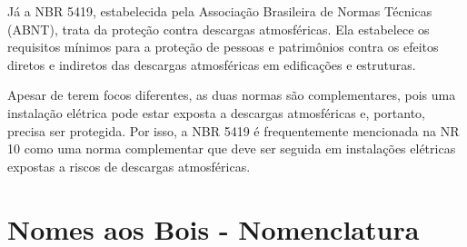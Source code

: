 \documentclass[a4paper, 12pt, onecolumn,singlespacing]{article}
\begin{document}
		Já a NBR 5419, estabelecida pela Associação Brasileira de Normas Técnicas (ABNT), trata da proteção contra descargas atmosféricas. Ela estabelece os requisitos mínimos para a proteção de pessoas e patrimônios contra os efeitos diretos e indiretos das descargas atmosféricas em edificações e estruturas.
		
		Apesar de terem focos diferentes, as duas normas são complementares, pois uma instalação elétrica pode estar exposta a descargas atmosféricas e, portanto, precisa ser protegida. Por isso, a NBR 5419 é frequentemente mencionada na NR 10 como uma norma complementar que deve ser seguida em instalações elétricas expostas a riscos de descargas atmosféricas.
		
	\section{Nomes aos Bois - Nomenclatura}
	
\end{document}
